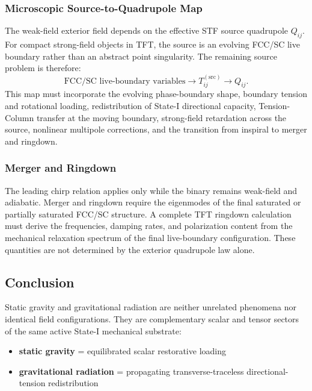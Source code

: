 \subsubsection{Microscopic Source-to-Quadrupole Map}
The weak-field exterior field depends on the effective STF source quadrupole $Q_{ij}$. For compact strong-field objects in TFT, the source is an evolving FCC/SC live boundary rather than an abstract point singularity. The remaining source problem is therefore:
\begin{equation}
    \text{FCC/SC live-boundary variables} \longrightarrow T_{ij}^{(\mathrm{src})} \longrightarrow Q_{ij}.
    \label{eq:n12_live_boundary_map}
\end{equation}
This map must incorporate the evolving phase-boundary shape, boundary tension and rotational loading, redistribution of State-I directional capacity, Tension-Column transfer at the moving boundary, strong-field retardation across the source, nonlinear multipole corrections, and the transition from inspiral to merger and ringdown.

\subsubsection{Merger and Ringdown}
The leading chirp relation applies only while the binary remains weak-field and adiabatic. Merger and ringdown require the eigenmodes of the final saturated or partially saturated FCC/SC structure. A complete TFT ringdown calculation must derive the frequencies, damping rates, and polarization content from the mechanical relaxation spectrum of the final live-boundary configuration. These quantities are not determined by the exterior quadrupole law alone.

\subsection{Conclusion}
\label{subsec:n12_conclusion}

Static gravity and gravitational radiation are neither unrelated phenomena nor identical field configurations. They are complementary scalar and tensor sectors of the same active State-I mechanical substrate:
\begin{itemize}
    \item \textbf{static gravity} = equilibrated scalar restorative loading
    \item \textbf{gravitational radiation} = propagating transverse-traceless directional-tension redistribution
\end{itemize}


